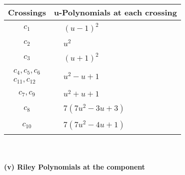 \documentclass[1p]{elsarticle_modified}
\theoremstyle{definition}
\begin{document}
\begin{tabular}{m{50pt}|m{274pt}}
Crossings & \hspace{64pt}u-Polynomials at each crossing \\
\hline $$\begin{aligned}c_{1}\end{aligned}$$&$\begin{aligned}
&(u-1)^2
\end{aligned}$\\
\hline $$\begin{aligned}c_{2}\end{aligned}$$&$\begin{aligned}
&u^2
\end{aligned}$\\
\hline $$\begin{aligned}c_{3}\end{aligned}$$&$\begin{aligned}
&(u+1)^2
\end{aligned}$\\
\hline $$\begin{aligned}c_{4},c_{5},c_{6}\\c_{11},c_{12}\end{aligned}$$&$\begin{aligned}
&u^2- u+1
\end{aligned}$\\
\hline $$\begin{aligned}c_{7},c_{9}\end{aligned}$$&$\begin{aligned}
&u^2+u+1
\end{aligned}$\\
\hline $$\begin{aligned}c_{8}\end{aligned}$$&$\begin{aligned}
&7(7 u^2-3 u+3)
\end{aligned}$\\
\hline $$\begin{aligned}c_{10}\end{aligned}$$&$\begin{aligned}
&7(7 u^2-4 u+1)
\end{aligned}$\\
\hline
\end{tabular}\\~\\
\newpage\renewcommand{\arraystretch}{1}
\flushleft \textbf{(v) Riley Polynomials at the component}\newline \\
\end{document}

